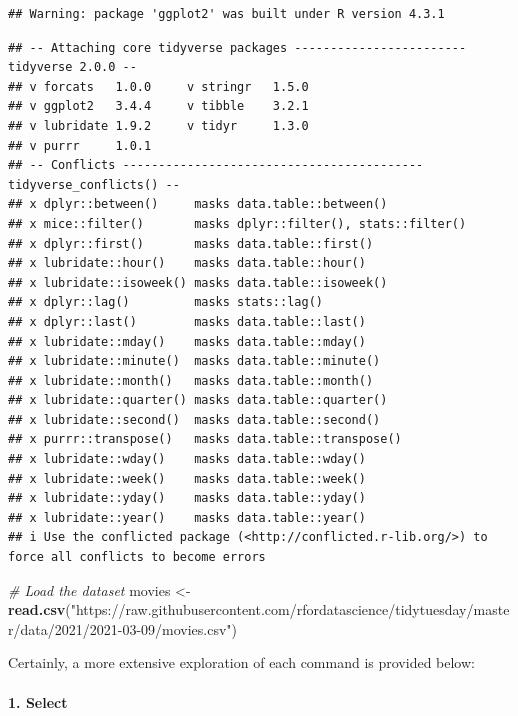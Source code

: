\documentclass[
  b5paper]{book}
\newenvironment{Shaded}{\begin{snugshade}}{\end{snugshade}}
\newcommand{\CommentTok}[1]{\textcolor[rgb]{0.56,0.35,0.01}{\textit{#1}}}
\newcommand{\FunctionTok}[1]{\textcolor[rgb]{0.13,0.29,0.53}{\textbf{#1}}}
\newcommand{\NormalTok}[1]{#1}
\newcommand{\OtherTok}[1]{\textcolor[rgb]{0.56,0.35,0.01}{#1}}
\newcommand{\StringTok}[1]{\textcolor[rgb]{0.31,0.60,0.02}{#1}}
\begin{document}
\begin{verbatim}
## Warning: package 'ggplot2' was built under R version 4.3.1
\end{verbatim}

\begin{verbatim}
## -- Attaching core tidyverse packages ------------------------ tidyverse 2.0.0 --
## v forcats   1.0.0     v stringr   1.5.0
## v ggplot2   3.4.4     v tibble    3.2.1
## v lubridate 1.9.2     v tidyr     1.3.0
## v purrr     1.0.1     
## -- Conflicts ------------------------------------------ tidyverse_conflicts() --
## x dplyr::between()     masks data.table::between()
## x mice::filter()       masks dplyr::filter(), stats::filter()
## x dplyr::first()       masks data.table::first()
## x lubridate::hour()    masks data.table::hour()
## x lubridate::isoweek() masks data.table::isoweek()
## x dplyr::lag()         masks stats::lag()
## x dplyr::last()        masks data.table::last()
## x lubridate::mday()    masks data.table::mday()
## x lubridate::minute()  masks data.table::minute()
## x lubridate::month()   masks data.table::month()
## x lubridate::quarter() masks data.table::quarter()
## x lubridate::second()  masks data.table::second()
## x purrr::transpose()   masks data.table::transpose()
## x lubridate::wday()    masks data.table::wday()
## x lubridate::week()    masks data.table::week()
## x lubridate::yday()    masks data.table::yday()
## x lubridate::year()    masks data.table::year()
## i Use the conflicted package (<http://conflicted.r-lib.org/>) to force all conflicts to become errors
\end{verbatim}

\begin{Shaded}
\begin{Highlighting}[]
\CommentTok{\# Load the dataset}
\NormalTok{movies }\OtherTok{\textless{}{-}} \FunctionTok{read.csv}\NormalTok{(}\StringTok{"https://raw.githubusercontent.com/rfordatascience/tidytuesday/master/data/2021/2021{-}03{-}09/movies.csv"}\NormalTok{)}
\end{Highlighting}
\end{Shaded}

Certainly, a more extensive exploration of each command is provided below:

\hypertarget{select}{%
\paragraph*{1. Select}\label{select}}
\end{document}
